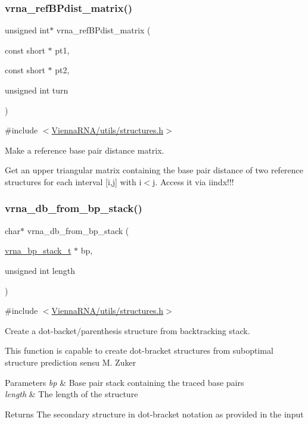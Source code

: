 \subsubsection{\texorpdfstring{vrna\_refBPdist\_matrix()}{vrna\_refBPdist\_matrix()}}
{\footnotesize\ttfamily unsigned int$\ast$ vrna\+\_\+ref\+B\+Pdist\+\_\+matrix (\begin{DoxyParamCaption}\item[{const short $\ast$}]{pt1,  }\item[{const short $\ast$}]{pt2,  }\item[{unsigned int}]{turn }\end{DoxyParamCaption})}



{\ttfamily \#include $<$\mbox{\hyperlink{utils_2structures_8h}{Vienna\+R\+N\+A/utils/structures.\+h}}$>$}



Make a reference base pair distance matrix. 

Get an upper triangular matrix containing the base pair distance of two reference structures for each interval \mbox{[}i,j\mbox{]} with i$<$j. Access it via iindx!!! \mbox{\label{group__struct__utils_ga27bea2c241564af53a065982183389df}} 
\subsubsection{\texorpdfstring{vrna\_db\_from\_bp\_stack()}{vrna\_db\_from\_bp\_stack()}}
{\footnotesize\ttfamily char$\ast$ vrna\+\_\+db\+\_\+from\+\_\+bp\+\_\+stack (\begin{DoxyParamCaption}\item[{\mbox{\hyperlink{group__data__structures_gaa651bda42e7692f08cb603cd6834b0ee}{vrna\+\_\+bp\+\_\+stack\+\_\+t}} $\ast$}]{bp,  }\item[{unsigned int}]{length }\end{DoxyParamCaption})}



{\ttfamily \#include $<$\mbox{\hyperlink{utils_2structures_8h}{Vienna\+R\+N\+A/utils/structures.\+h}}$>$}



Create a dot-\/backet/parenthesis structure from backtracking stack. 

This function is capable to create dot-\/bracket structures from suboptimal structure prediction sensu M. Zuker


\begin{DoxyParams}{Parameters}
{\em bp} & Base pair stack containing the traced base pairs \\
\hline
{\em length} & The length of the structure \\
\hline
\end{DoxyParams}
\begin{DoxyReturn}{Returns}
The secondary structure in dot-\/bracket notation as provided in the input 
\end{DoxyReturn}
